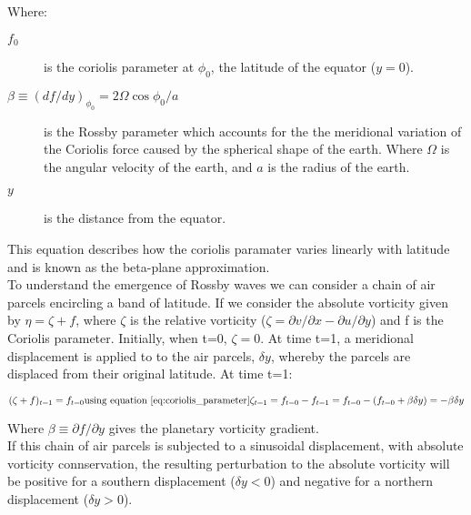 \documentclass{article}
\begin{document}
Where:

\begin{description}
    \item[$f_0$] is the coriolis parameter at $\phi_0$, the latitude of the equator ($y=0$).
    \item[$\beta \equiv (df/dy)_{\phi_0} = 2 \Omega \cos{\phi_0/a}$]  is the Rossby parameter which accounts for the the meridional variation of the Coriolis force caused by the spherical shape of the earth. Where $\Omega$ is the angular velocity of the earth, and $a$ is the radius of the earth.
    \item[$y$] is the distance from the equator.
\end{description}

This equation describes how the coriolis paramater varies linearly with latitude and is known as the beta-plane approximation.\\

To understand the emergence of Rossby waves we can consider a chain of air parcels encircling a band of latitude. If we consider the absolute vorticity given by $\eta = \zeta + f$, where $\zeta$ is the relative vorticity ($\zeta = \partial v / \partial x - \partial u / \partial y$) and f is the Coriolis parameter. Initially, when t=0, $\zeta = 0$. At time t=1, a meridional displacement is applied to to the air parcels, $\delta y$, whereby the parcels are displaced from their original latitude. At time t=1:

\begin{equation}
    (\zeta + f)_{t=1} = f_{t=0}\\

    $\text{using equation \ref{eq:coriolis_parameter}}$\\

    \zeta_{t=1} = f_{t=0} - f_{t=1} = f_{t=0} - (f_{t=0} + \beta \delta y) = -\beta \delta y
\label{eq:zeta}
\end{equation}


Where $\beta \equiv \partial f/ \partial y$ gives the planetary vorticity gradient.\\


If this chain of air parcels is subjected to a sinusoidal displacement, with absolute vorticity connservation, the resulting perturbation to the absolute vorticity will be positive for a southern displacement ($\delta y < 0$) and negative for a northern displacement ($\delta y > 0$).\\
\end{document}
